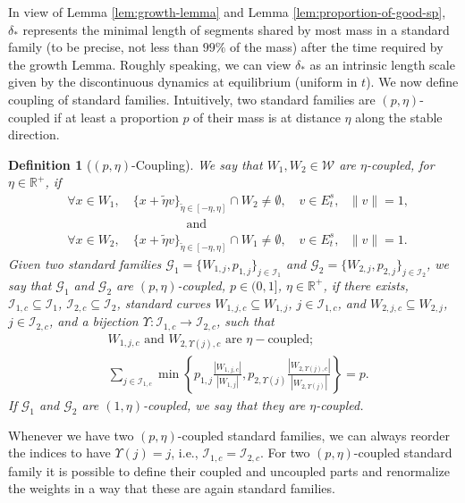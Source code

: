 \documentclass{amsart}
\numberwithin{equation}{section}
\newtheorem{definition}[theorem]{Definition}
\newcommand\cG{{\mathcal G}}
\newcommand\cI{{\mathcal I}}
\newcommand\cW{{\mathcal W}}
\newcommand\bR{{\mathbb R}}
\begin{document}
In view of Lemma \ref{lem:growth-lemma} and Lemma \ref{lem:proportion-of-good-sp}, \(\delta_{*}\) represents the minimal length of segments shared by most mass in a standard family (to be precise, not less than \(99\%\) of the mass) after the time required by the growth Lemma. Roughly speaking, we can view \(\delta_{*}\) as an intrinsic length scale given by the discontinuous dynamics at equilibrium (uniform in \(t\)). We now define coupling of standard families. Intuitively, two standard families are \((p,\eta)\)-coupled if at least a proportion \(p\) of their mass is at distance \(\eta\) along the stable direction.
\begin{definition}[\((p,\eta)\)-Coupling] \label{def:(p,eta)-coupling}
We say that \(W_1, W_2 \in \cW\) are \(\eta\)-\textit{coupled}, for \(\eta \in \bR^+\), if 
\[
\begin{split}
     &\forall x \in W_1, \quad \{x + \widetilde \eta v\}_{\widetilde \eta \in [-\eta, \eta]} \cap W_2 \neq \emptyset, \quad v \in E^s_t, \text{ }\|v\| =1,\\
    &\hspace{4cm}\text{and}\\
    &\forall x \in W_2, \quad \{x + \widetilde \eta v\}_{\widetilde \eta \in [-\eta, \eta]} \cap W_1 \neq \emptyset, \quad v \in E^s_t, \text{ }\|v\| =1.
\end{split}
\]
Given two standard families \(\cG_1 = \{W_{1,j}, p_{1,j}\}_{j \in \cI_1}\) and \(\cG_2 = \{W_{2,j}, p_{2,j}\}_{j \in \cI_2}\), we say that \(\cG_1\) and \(\cG_2\) are \((p, \eta)\)-coupled, \(p \in (0,1]\), \(\eta \in \bR^+\), if there exists, \(\cI_{1,c} \subseteq \cI_1\), \(\cI_{2,c} \subseteq \cI_2\), standard curves \(W_{1,j,c} \subseteq W_{1,j}\), \(j \in  \cI_{1,c}\), and \( W_{2,j,c} \subseteq W_{2,j}\), \(j \in  \cI_{2,c}\), and a bijection \(\Upsilon :  \cI_{1,c} \to  \cI_{2,c}\), such that 
\[
\begin{split}
    &W_{1,j,c} \text{ and } W_{2, \Upsilon(j),c}  \text{ are } \eta-\text{coupled};\\
  &\sum_{j \in  \cI_{1,c}} \min\left\{p_{1,j} \frac{|W_{1,j,c}|}{|W_{1,j}|}, p_{2,\Upsilon(j)} \frac{|W_{2,\Upsilon(j),c}|}{|W_{2,\Upsilon(j)}|}\right\} = p.
\end{split}
\]
 If \(\cG_1\) and \(\cG_2\) are \((1,\eta)\)-coupled, we say that they are \(\eta\)-coupled.
\end{definition}
Whenever we have two \((p,\eta)\)-coupled standard families, we can always reorder the indices to have \(\Upsilon(j) = j\), i.e., \(\cI_{1,c} = \cI_{2,c}\). For two \((p,\eta)\)-coupled standard family it is possible to define their coupled and uncoupled parts and renormalize the weights in a way that these are again standard families.
\end{document}
